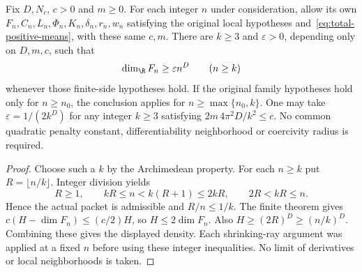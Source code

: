 \begin{theorem}\label{thm:volume-full-tail}
Fix $D,N_c$, $c>0$ and $m\geq0$. For each integer $n$ under consideration,
allow its own $F_n,C_n,L_n,\Phi_n,K_n,\delta_n,r_n,w_n$ satisfying the
original local hypotheses and~\eqref{eq:total-positive-means}, with these
same $c,m$. There are $k\geq3$ and $\varepsilon>0$, depending only on
$D,m,c$, such that
\[
 \dim_{\R}F_n\geq\varepsilon n^D\qquad(n\geq k)
\]
whenever those finite-side hypotheses hold. If the original family hypotheses hold only for $n\geq n_0$, the conclusion applies for $n\geq\max\{n_0,k\}$. One may take
$\varepsilon=1/(2k^D)$ for any integer $k\geq3$ satisfying
$2m\,4\pi^2D/k^2\leq c$. No common quadratic penalty constant,
differentiability neighborhood or coercivity radius is required.
\end{theorem}
\begin{proof}
Choose such a $k$ by the Archimedean property. For each $n\geq k$ put
$R=\lfloor n/k\rfloor$. Integer division yields
\[
 R\geq1,\qquad kR\leq n<k(R+1)\leq2kR,\qquad2R<kR\leq n.
\]
Hence the actual packet is admissible and $R/n\leq1/k$. The finite theorem
gives $c(H-\dim F_n)\leq(c/2)H$, so $H\leq2\dim F_n$. Also
$H\geq(2R)^D\geq(n/k)^D$. Combining these gives the displayed density.
Each shrinking-ray argument was applied at a fixed $n$ before using these
integer inequalities. No limit of derivatives or local neighborhoods is taken.
\end{proof}

